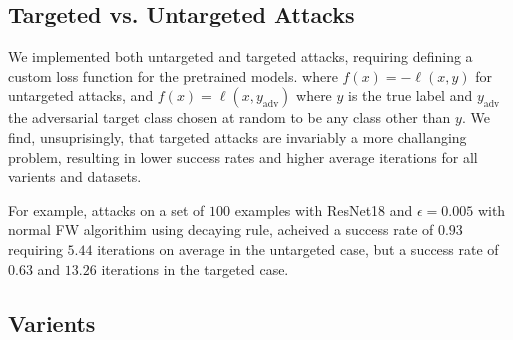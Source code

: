 \documentclass{article}
\begin{document}
\subsection{Targeted vs. Untargeted Attacks}
We implemented both untargeted and targeted attacks, requiring defining a custom loss function for the pretrained models. where $f(x) = -\ell(x, y)$ for untargeted attacks, and $f(x) = \ell(x, y_\text{adv})$ where $y$ is the true label and $y_\text{adv}$ the adversarial target class chosen at random to be any class other than $y$. We find, unsuprisingly, that targeted attacks are invariably a more challanging problem, resulting in lower success rates and higher average iterations for all varients and datasets.

For example, attacks on a set of $100$ examples with ResNet18 and $\epsilon = 0.005$ with normal FW algorithim using decaying rule, acheived a success rate of $0.93$ requiring $5.44$ iterations on average in the untargeted case, but a success rate of $0.63$ and $13.26$ iterations in the targeted case.

\subsection{Varients}

\begin{table}[H]
    \centering
    \caption{Accuracies and Average Iterations of Different Frank-Wolfe Algorithm Variants on Three Datasets}
    \label{tab:algorithm_performance}
\end{table}
\end{document}
